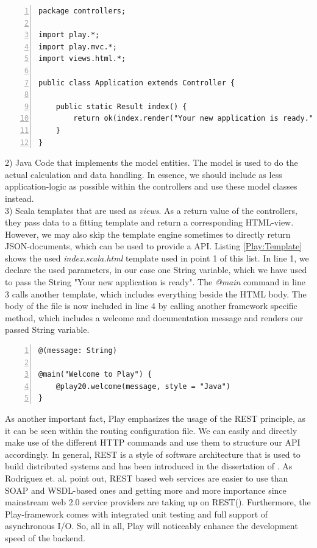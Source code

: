 \begin{lstlisting}[numbers=left,caption={Simple Java-controller within the Play Framework},label=Play:Controller,frame=tlbr,breaklines]
package controllers;

import play.*;
import play.mvc.*;
import views.html.*;

public class Application extends Controller {

    public static Result index() {
        return ok(index.render("Your new application is ready."));
    }
}
\end{lstlisting}

2) Java Code that implements the model entities. The model is used to do the actual calculation and data handling. In essence, we should include as less application-logic as possible within the controllers and use these model classes instead. \\
3) Scala templates that are used as \textit{views}. As a return value of the controllers, they pass data to a fitting template and return a corresponding \ac{HTML}-view. However, we may also skip the template engine sometimes to directly return \ac{JSON}-documents, which can be used to provide a \ac{API}. Listing \ref{Play:Template} shows the used \textit{index.scala.html} template used in point 1 of this list. In line 1, we declare the used parameters, in our case one String variable, which we have used to pass the String "Your new application is ready". The \textit{@main} command in line 3 calls another template, which includes everything beside the \ac{HTML} body. The body of the file is now included in line 4 by calling another framework specific method, which includes a welcome and documentation message and renders our passed String variable.

\begin{lstlisting}[numbers=left,caption={Simple Scala template within the Play Framework},label=Play:Template,frame=tlbr,breaklines]
@(message: String)

@main("Welcome to Play") {
    @play20.welcome(message, style = "Java")
}
\end{lstlisting}

As another important fact, Play emphasizes the usage of the \ac{REST} principle, as it can be seen within the routing configuration file. We can easily and directly make use of the different \ac{HTTP} commands and use them to structure our \ac{API} accordingly. In general, \acf{REST} is a style of software architecture that is used to build distributed systems and has been introduced in the dissertation of \cite{Fielding2000}. 
As Rodriguez et. al. point out, \ac{REST} based web services are easier to use than \acf{SOAP} and \acf{WSDL}-based ones and getting more and more importance since mainstream web 2.0 service providers are taking up on \ac{REST}(\cite{Rodriguez2008}). Furthermore, the Play-framework comes with integrated unit testing and full support of asynchronous I/O. So, all in all, Play will noticeably enhance the development speed of the backend.

